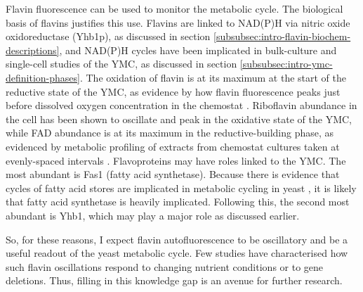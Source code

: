 Flavin fluorescence can be used to monitor the metabolic cycle.
The biological basis of flavins justifies this use.
Flavins are linked to NAD(P)H via nitric oxide oxidoreductase (Yhb1p), as discussed in section \ref{subsubsec:intro-flavin-biochem-descriptions}, and NAD(P)H cycles have been implicated in bulk-culture \parencite{tuLogicYeastMetabolic2005} %
and single-cell \parencite{papagiannakisAutonomousMetabolicOscillations2017} studies of the YMC, as discussed in section \ref{subsubsec:intro-ymc-definition-phases}.
The oxidation of flavin is at its maximum at the start of the reductive state of the YMC, as evidence by how flavin fluorescence peaks just before dissolved oxygen concentration in the chemostat \parencite{murrayRedoxRegulationRespiring2011,sasidharanTimeStructureYeastMetabolism2012}.
Riboflavin abundance in the cell has been shown to oscillate and peak in the oxidative state of the YMC, while FAD abundance is at its maximum in the reductive-building phase, as evidenced by metabolic profiling of extracts from chemostat cultures taken at evenly-spaced intervals \parencite{tuCyclicChangesMetabolic2007}.
Flavoproteins may have roles linked to the YMC.
The most abundant is Fas1 (fatty acid synthetase).
Because there is evidence that cycles of fatty acid stores are implicated in metabolic cycling in yeast \parencite{campbellBuildingBlocksAre2020}, it is likely that fatty acid synthetase is heavily implicated.
Following this, the second most abundant is Yhb1, which may play a major role as discussed earlier.

So, for these reasons, I expect flavin autofluorescence to be oscillatory and be a useful readout of the yeast metabolic cycle.
Few studies have characterised how such flavin oscillations respond to changing nutrient conditions or to gene deletions.
Thus, filling in this knowledge gap is an avenue for further research.

